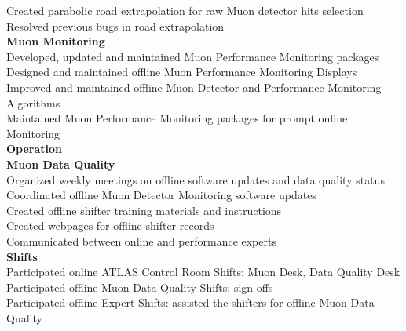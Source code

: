\documentclass[letterpaper,11pt,oneside]{article}
\begin{document}
	\quad \quad Created parabolic road extrapolation for raw Muon detector hits selection \\
	\quad \quad Resolved previous bugs in road extrapolation \\
	\vspace{0.1cm}
 	\quad \textbf{Muon Monitoring}\\
	\quad \quad Developed, updated and maintained Muon Performance Monitoring packages\\
	\quad \quad Designed and maintained offline Muon Performance Monitoring Displays \\
	\quad \quad Improved and maintained offline Muon Detector and Performance Monitoring Algorithms\\
	\quad \quad Maintained Muon Performance Monitoring packages for prompt online Monitoring \\
	\vspace{0.4cm}
 \textbf{Operation}\\
	\vspace{0.1cm}
 	\quad \textbf{Muon Data Quality}\\
	\quad \quad Organized weekly meetings on offline software updates and data quality status \\
	\quad \quad Coordinated offline Muon Detector Monitoring software updates\\
	\quad \quad Created offline shifter training materials and instructions  \\
	\quad \quad Created webpages for offline shifter records  \\
	\quad \quad Communicated between online and performance experts  \\
	\vspace{0.1cm}
 	\quad \textbf{Shifts}\\
	\quad \quad Participated online ATLAS Control Room Shifts: Muon Desk,  Data Quality Desk \\
	\quad \quad Participated offline Muon Data Quality Shifts: sign-offs \\
	\quad \quad Participated offline Expert Shifts: assisted the shifters for offline Muon Data Quality \\
\end{document}
